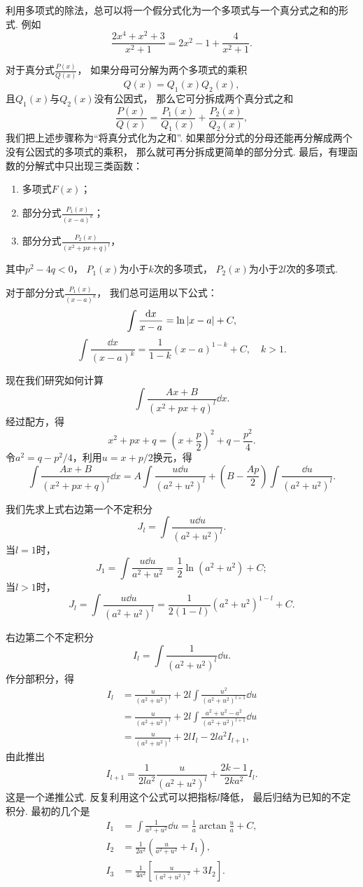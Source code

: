 利用多项式的除法，总可以将一个假分式化为一个多项式与一个真分式之和的形式.
例如\[
	\frac{2x^4+x^2+3}{x^2+1}
	= 2x^2-1+\frac{4}{x^2+1}.
\]

对于真分式\(\frac{P(x)}{Q(x)}\)，
如果分母可分解为两个多项式的乘积\[
	Q(x)=Q_1(x)Q_2(x),
\]
且\(Q_1(x)\)与\(Q_2(x)\)没有公因式，
那么它可分拆成两个真分式之和\[
	\frac{P(x)}{Q(x)} = \frac{P_1(x)}{Q_1(x)} + \frac{P_2(x)}{Q_2(x)},
\]
我们把上述步骤称为“将真分式化为之和”.
如果部分分式的分母还能再分解成两个没有公因式的多项式的乘积，
那么就可再分拆成更简单的部分分式.
最后，有理函数的分解式中只出现三类函数：
\begin{enumerate}
	\item 多项式\(F(x)\)；
	\item 部分分式\(\frac{P_1(x)}{(x-a)^k}\)；
	\item 部分分式\(\frac{P_2(x)}{(x^2+px+q)^l}\)，
\end{enumerate}
其中\(p^2-4q<0\)，
\(P_1(x)\)为小于\(k\)次的多项式，
\(P_2(x)\)为小于\(2l\)次的多项式.

对于部分分式\(\frac{P_1(x)}{(x-a)^k}\)，
我们总可运用以下公式：\[
	\int \frac{\dd{x}}{x-a} = \ln\abs{x-a} + C,
\]\[
	\int \frac{\dd{x}}{(x-a)^k} = \frac{1}{1-k} (x-a)^{1-k} + C,
	\quad k>1.
\]

现在我们研究如何计算\[
	\int \frac{Ax+B}{(x^2+px+q)^l} \dd{x}.
\]
经过配方，得\[
	x^2+px+q = \left(x+\frac{p}{2}\right)^2 + q-\frac{p^2}{4}.
\]
令\(a^2=q-p^2/4\)，利用\(u=x+p/2\)换元，得\[
	\int \frac{Ax+B}{(x^2+px+q)^l} \dd{x}
	= A \int \frac{u \dd{u}}{(a^2+u^2)^l}
	+ \left(B - \frac{Ap}{2}\right) \int \frac{\dd{u}}{(a^2+u^2)^l}.
\]

我们先求上式右边第一个不定积分\[
	J_l = \int \frac{u \dd{u}}{(a^2+u^2)^l}.
\]
当\(l=1\)时，\[
	J_1
	= \int \frac{u \dd{u}}{a^2+u^2}
	= \frac{1}{2} \ln(a^2+u^2) + C;
\]
当\(l>1\)时，\[
	J_l
	= \int \frac{u \dd{u}}{(a^2+u^2)^l}
	= \frac{1}{2(1-l)} (a^2+u^2)^{1-l} + C.
\]

右边第二个不定积分\[
	I_l = \int \frac{1}{(a^2+u^2)^l} \dd{u}.
\]
作分部积分，得\begin{align*}
	I_l &= \frac{u}{(a^2+u^2)^l} + 2l \int \frac{u^2}{(a^2+u^2)^{l+1}} \dd{u} \\
	&= \frac{u}{(a^2+u^2)^l} + 2l \int \frac{a^2+u^2-a^2}{(a^2+u^2)^{l+1}} \dd{u} \\
	&= \frac{u}{(a^2+u^2)^l} + 2l I_l - 2la^2 I_{l+1},
\end{align*}
由此推出\[
	I_{l+1} = \frac{1}{2la^2} \frac{u}{(a^2+u^2)^l} + \frac{2k-1}{2ka^2} I_l.
\]
这是一个递推公式.
反复利用这个公式可以把指标\(l\)降低，
最后归结为已知的不定积分.
最初的几个是\begin{align*}
	I_1 &= \int \frac{1}{a^2+u^2} \dd{u} = \frac{1}{a} \arctan\frac{u}{a} + C, \\
	I_2 &= \frac{1}{2a^2} \left( \frac{u}{a^2+u^2} + I_1 \right), \\
	I_3 &= \frac{1}{4a^2} \left[ \frac{u}{(a^2+u^2)^2} + 3 I_2 \right].
\end{align*}

